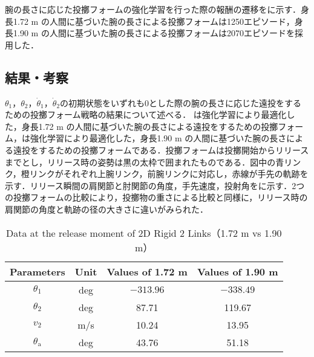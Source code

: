 腕の長さに応じた投擲フォームの強化学習を行った際の報酬の遷移をに示す．身長1.72 m の人間に基づいた腕の長さによる投擲フォームは1250エピソード，身長1.90 m の人間に基づいた腕の長さによる投擲フォームは2070エピソードを採用した．


\subsection{結果・考察}
$\theta_{1}$，$\theta_{2}$，$\dot{\theta}_{1}$，$\dot{\theta}_{2}$の初期状態をいずれも0とした際の腕の長さに応じた遠投をするための投擲フォーム戦略の結果について述べる．
は強化学習により最適化した，身長1.72 m の人間に基づいた腕の長さによる遠投をするための投擲フォーム，は強化学習により最適化した，身長1.90 m の人間に基づいた腕の長さによる遠投をするための投擲フォームである．投擲フォームは投擲開始からリリースまでとし，リリース時の姿勢は黒の太枠で囲まれたものである．図中の青リンク，橙リンクがそれぞれ上腕リンク，前腕リンクに対応し，赤線が手先の軌跡を示す．リリース瞬間の肩関節と肘関節の角度，手先速度，投射角をに示す．2つの投擲フォームの比較により，投擲物の重さによる比較と同様に，リリース時の肩関節の角度と軌跡の径の大きさに違いがみられた．

\begin{table}[tb]
  \begin{center}
    \caption{Data at the release moment of 2D Rigid 2 Links（1.72 m vs 1.90 m）}
    \begin{tabular}{c|c|c|c}
      \hline
      Parameters & Unit & Values of 1.72 m & Values of 1.90 m \\
      \hline
      $\theta_{1}$ & deg & $-313.96$ & $-338.49$ \\
      $\theta_{2}$ & deg & 87.71 & 119.67 \\
      $v_{2}$ & m/s & 10.24 & 13.95 \\
      $\theta_{\mathrm{a}}$ & deg & 43.76 & 51.18 \\
      \hline
    \end{tabular}
  \end{center}
\end{table}

